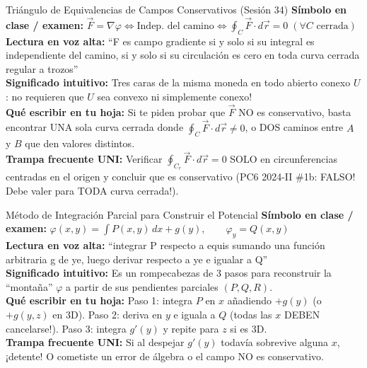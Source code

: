 \documentclass[11pt,a4paper]{article}
\begin{document}
\begin{definicionbox}{Triángulo de Equivalencias de Campos Conservativos (Sesión 34)}
\textbf{Símbolo en clase / examen:} $\vec{F} = \nabla\varphi \iff \text{Indep. del camino} \iff \oint_C \vec{F}\cdot d\vec{r} = 0\; (\forall C \text{ cerrada})$\\[0.15cm]
\textbf{Lectura en voz alta:} ``F es campo gradiente si y solo si su integral es independiente del camino, si y solo si su circulación es cero en toda curva cerrada regular a trozos''\\[0.12cm]
\textbf{Significado intuitivo:} Tres caras de la misma moneda en todo abierto conexo $U$: no requieren que $U$ sea convexo ni simplemente conexo!\\[0.12cm]
\textbf{Qué escribir en tu hoja:} Si te piden probar que $\vec{F}$ NO es conservativo, basta encontrar UNA sola curva cerrada donde $\oint_C \vec{F}\cdot d\vec{r} \neq 0$, o DOS caminos entre $A$ y $B$ que den valores distintos.\\[0.12cm]
\textbf{Trampa frecuente UNI:} Verificar $\oint_{C_r} \vec{F}\cdot d\vec{r} = 0$ SOLO en circunferencias centradas en el origen y concluir que es conservativo (PC6 2024-II \#1b: FALSO! Debe valer para TODA curva cerrada!).
\end{definicionbox}

\begin{definicionbox}{Método de Integración Parcial para Construir el Potencial}
\textbf{Símbolo en clase / examen:} $\varphi(x,y) = \int P(x,y)\,dx + g(y), \qquad \varphi_y = Q(x,y)$\\[0.15cm]
\textbf{Lectura en voz alta:} ``integrar P respecto a equis sumando una función arbitraria g de ye, luego derivar respecto a ye e igualar a Q''\\[0.12cm]
\textbf{Significado intuitivo:} Es un rompecabezas de 3 pasos para reconstruir la ``montaña'' $\varphi$ a partir de sus pendientes parciales $(P, Q, R)$.\\[0.12cm]
\textbf{Qué escribir en tu hoja:} Paso 1: integra $P$ en $x$ añadiendo $+g(y)$ (o $+g(y,z)$ en 3D). Paso 2: deriva en $y$ e iguala a $Q$ (todas las $x$ DEBEN cancelarse!). Paso 3: integra $g'(y)$ y repite para $z$ si es 3D.\\[0.12cm]
\textbf{Trampa frecuente UNI:} Si al despejar $g'(y)$ todavía sobrevive alguna $x$, ¡detente! O cometiste un error de álgebra o el campo NO es conservativo.
\end{definicionbox}
\end{document}
